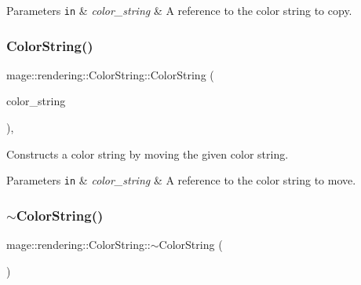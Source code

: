 \begin{DoxyParams}[1]{Parameters}
\mbox{\tt in}  & {\em color\+\_\+string} & A reference to the color string to copy. \\
\hline
\end{DoxyParams}
\mbox{\label{classmage_1_1rendering_1_1_color_string_a642793608186e9ac9931827ae9f0c57a}} 
\subsubsection{\texorpdfstring{Color\+String()}{ColorString()}\hspace{0.1cm}{\footnotesize\ttfamily [3/3]}}
{\footnotesize\ttfamily mage\+::rendering\+::\+Color\+String\+::\+Color\+String (\begin{DoxyParamCaption}\item[{\mbox{\hyperlink{classmage_1_1rendering_1_1_color_string}{Color\+String}} \&\&}]{color\+\_\+string }\end{DoxyParamCaption})\hspace{0.3cm}{\ttfamily [default]}, {\ttfamily [noexcept]}}

Constructs a color string by moving the given color string.


\begin{DoxyParams}[1]{Parameters}
\mbox{\tt in}  & {\em color\+\_\+string} & A reference to the color string to move. \\
\hline
\end{DoxyParams}
\mbox{\label{classmage_1_1rendering_1_1_color_string_a13ab2218e1cbe99241283214e455f3c9}} 
\subsubsection{\texorpdfstring{$\sim$\+Color\+String()}{~ColorString()}}
{\footnotesize\ttfamily mage\+::rendering\+::\+Color\+String\+::$\sim$\+Color\+String (\begin{DoxyParamCaption}{ }\end{DoxyParamCaption})\hspace{0.3cm}{\ttfamily [default]}}

